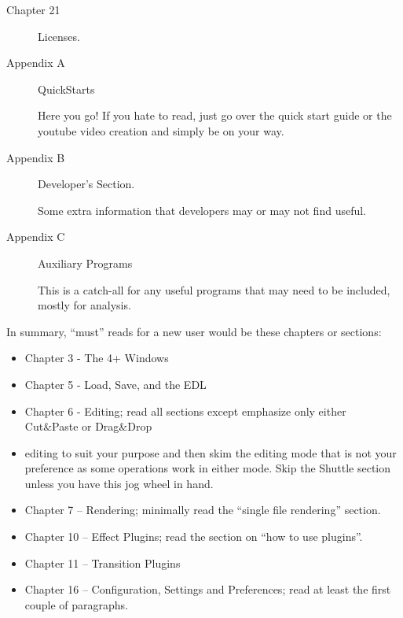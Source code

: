 \begin{description}
    \item[Chapter 21] Licenses.

    \item[Appendix A] QuickStarts

        Here you go! If you hate to read, just go over the quick start guide or the youtube video creation and simply be on your way.

    \item[Appendix B] Developer’s Section.

        Some extra information that developers may or may not find useful.

    \item[Appendix C] Auxiliary Programs

        This is a catch-all for any useful programs that may need to be included, mostly for analysis.

\end{description}

In summary, “must” reads for a new user would be these chapters or sections:

\begin{itemize}
    \item Chapter 3 - The 4+ Windows
    \item Chapter 5 - Load, Save, and the EDL
    \item Chapter 6 - Editing; read all sections except emphasize only either Cut\&Paste or Drag\&Drop

    \item editing to suit your purpose and then skim the editing mode that is not your preference as some operations work in either mode. Skip the Shuttle section unless you have this jog wheel in hand.
    \item Chapter 7 – Rendering; minimally read the “single file rendering” section.
    \item Chapter 10 – Effect Plugins; read the section on “how to use plugins”.
    \item Chapter 11 – Transition Plugins
    \item Chapter 16 – Configuration, Settings and Preferences; read at least the first couple of paragraphs.
\end{itemize}


